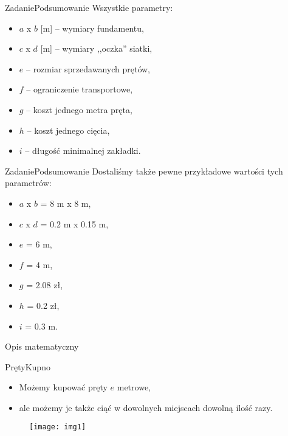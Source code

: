 \documentclass[11pt]{beamer}
\begin{document}
\begin{frame}{Zadanie}{Podsumowanie}
Wszystkie parametry:
\begin{itemize}
\item<1-> $a$ x $b$ [m] -- wymiary fundamentu,
\item<2-> $c$ x $d$ [m] -- wymiary ,,oczka'' siatki,
\item<3-> $e$ -- rozmiar sprzedawanych prętów,
\item<6-> $f$ -- ograniczenie transportowe,
\item<4-> $g$ -- koszt jednego metra pręta,
\item<5-> $h$ -- koszt jednego cięcia,
\item<7-> $i$ -- długość minimalnej zakładki.
\end{itemize}
\end{frame}

\begin{frame}{Zadanie}{Podsumowanie}
Dostaliśmy także pewne przykładowe wartości tych parametrów:
\begin{itemize}
\item[ ] $a$ x $b$ = 8 m x 8 m,
\item[ ] $c$ x $d$ = 0.2 m x 0.15 m,
\item[ ] $e$ = 6 m,
\item[ ] $f$ = 4 m,
\item[ ] $g$ = 2.08 zł,
\item[ ] $h$ = 0.2 zł,
\item[ ] $i$ = 0.3 m.
\end{itemize}
\end{frame}


\begin{frame}
\begin{center}
\LARGE Opis matematyczny
\end{center}
\end{frame}


\begin{frame}{Pręty}{Kupno}
\begin{itemize}
\item Możemy kupować pręty $e$ metrowe,
\item ale możemy je także ciąć w dowolnych miejscach dowolną ilość razy.
\end{itemize}

\begin{figure}[h!]
	\centering
	\texttt{[image: img1]}
\end{figure}
\end{frame}
\end{document}
